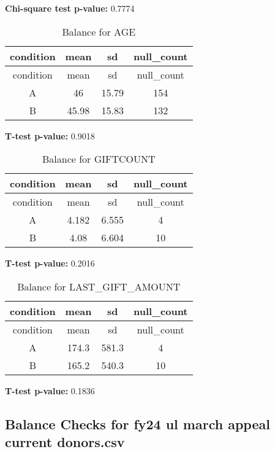 \documentclass[
]{article}
\begin{document}
\textbf{Chi-square test p-value:} 0.7774\\
\pagebreak

\begin{longtable}[]{@{}cccc@{}}
\caption{Balance for AGE}\tabularnewline
\toprule\noalign{}
condition & mean & sd & null\_count \\
\midrule\noalign{}
\endfirsthead
\toprule\noalign{}
condition & mean & sd & null\_count \\
\midrule\noalign{}
\endhead
\bottomrule\noalign{}
\endlastfoot
A & 46 & 15.79 & 154 \\
B & 45.98 & 15.83 & 132 \\
\end{longtable}

\textbf{T-test p-value:} 0.9018\\
\pagebreak

\begin{longtable}[]{@{}cccc@{}}
\caption{Balance for GIFTCOUNT}\tabularnewline
\toprule\noalign{}
condition & mean & sd & null\_count \\
\midrule\noalign{}
\endfirsthead
\toprule\noalign{}
condition & mean & sd & null\_count \\
\midrule\noalign{}
\endhead
\bottomrule\noalign{}
\endlastfoot
A & 4.182 & 6.555 & 4 \\
B & 4.08 & 6.604 & 10 \\
\end{longtable}

\textbf{T-test p-value:} 0.2016\\
\pagebreak

\begin{longtable}[]{@{}cccc@{}}
\caption{Balance for LAST\_GIFT\_AMOUNT}\tabularnewline
\toprule\noalign{}
condition & mean & sd & null\_count \\
\midrule\noalign{}
\endfirsthead
\toprule\noalign{}
condition & mean & sd & null\_count \\
\midrule\noalign{}
\endhead
\bottomrule\noalign{}
\endlastfoot
A & 174.3 & 581.3 & 4 \\
B & 165.2 & 540.3 & 10 \\
\end{longtable}

\textbf{T-test p-value:} 0.1836\\
\pagebreak \clearpage

\subsection{Balance Checks for fy24 ul march appeal current
donors.csv}\label{balance-checks-for-fy24-ul-march-appeal-current-donors.csv}
\end{document}
